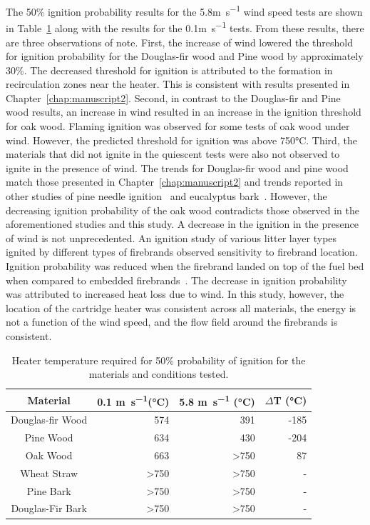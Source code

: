     The 50\% ignition probability results for the 5.8\si{\meter\per\second} wind speed tests are shown in Table~\ref{tab:composition50temp} along with the results for the 0.1\si{\meter\per\second} tests. From these results, there are three observations of note. First, the increase of wind lowered the threshold for ignition probability for the Douglas-fir wood and Pine wood by approximately 30\%. The decreased threshold for ignition  is attributed to the formation in recirculation zones near the heater. This is consistent with results presented in Chapter~\ref{chap:manuscript2}. Second, in contrast to the Douglas-fir and Pine wood results, an increase in wind resulted in an increase in the ignition threshold for oak wood. Flaming ignition was observed for some tests of oak wood under wind. However, the predicted threshold for ignition was above 750\si{\celsius}. Third, the materials that did not ignite in the quiescent tests were also not observed to ignite in the presence of wind. The trends for Douglas-fir wood and pine wood match those presented in Chapter~\ref{chap:manuscript2} and trends reported in other studies of pine needle ignition~\cite{Wang2017} and eucalyptus bark~\cite{Ellis2011, Ellis2015}. However, the decreasing ignition probability of the oak wood contradicts those observed in the aforementioned studies and this study. A decrease in the ignition in the presence of wind is not unprecedented. An ignition study of various litter layer types ignited by different types of firebrands observed sensitivity to firebrand location. Ignition probability was reduced when the firebrand landed on top of the fuel bed when compared to embedded firebrands~\cite{Plucinski2008}. The decrease in ignition probability was attributed to increased heat loss due to wind. In this study, however, the location of the cartridge heater was consistent across all materials, the energy is not a function of the wind speed, and the flow field around the firebrands is consistent.      
        \begin{table}[hpbt]
            \caption{Heater temperature required for 50\% probability of ignition for the materials and conditions tested.}
            \centering
            \begin{tabular}{crrr}
                Material & 0.1 \si{\meter\per\second}(\si{\celsius}) & 5.8 \si{\meter\per\second} (\si{\celsius}) & $\Delta$T (\si{\celsius})\\
                \hline
                Douglas-fir Wood & 574  & 391 & -185 \\
                Pine Wood        & 634  & 430 & -204\\
                Oak Wood         & 663  & \textgreater750 & 87\\
                Wheat Straw      & \textgreater750 & \textgreater750 & -\\
                Pine Bark        & \textgreater750 & \textgreater750 & -\\
                Douglas-Fir Bark & \textgreater750 & \textgreater750 & -
            \end{tabular}
            \label{tab:composition50temp}
        \end{table}
